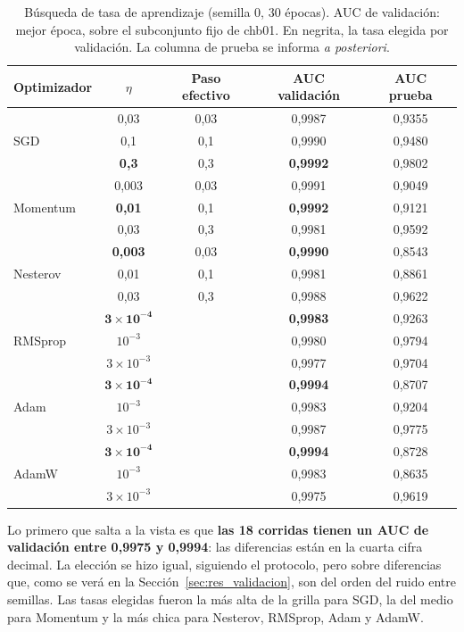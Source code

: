 \begin{table}[ht]
\centering
\caption{Búsqueda de tasa de aprendizaje (semilla 0, 30 épocas). AUC de validación: mejor época, sobre el subconjunto
fijo de chb01. En negrita, la tasa elegida por validación. La columna de prueba se informa \emph{a posteriori}.}
\label{tab:busqueda}
\begin{tabular}{lcccc}
\toprule
Optimizador & $\eta$ & Paso efectivo & AUC validación & AUC prueba \\
\midrule
\multirow{3}{*}{SGD}
 & 0,03 & 0,03 & 0,9987 & 0,9355 \\
 & 0,1  & 0,1  & 0,9990 & 0,9480 \\
 & \textbf{0,3} & 0,3 & \textbf{0,9992} & 0,9802 \\
\midrule
\multirow{3}{*}{Momentum}
 & 0,003 & 0,03 & 0,9991 & 0,9049 \\
 & \textbf{0,01} & 0,1 & \textbf{0,9992} & 0,9121 \\
 & 0,03  & 0,3  & 0,9981 & 0,9592 \\
\midrule
\multirow{3}{*}{Nesterov}
 & \textbf{0,003} & 0,03 & \textbf{0,9990} & 0,8543 \\
 & 0,01  & 0,1  & 0,9981 & 0,8861 \\
 & 0,03  & 0,3  & 0,9988 & 0,9622 \\
\midrule
\multirow{3}{*}{RMSprop}
 & $\mathbf{3\times10^{-4}}$ & & \textbf{0,9983} & 0,9263 \\
 & $10^{-3}$        & & 0,9980 & 0,9794 \\
 & $3\times10^{-3}$ & & 0,9977 & 0,9704 \\
\midrule
\multirow{3}{*}{Adam}
 & $\mathbf{3\times10^{-4}}$ & & \textbf{0,9994} & 0,8707 \\
 & $10^{-3}$        & & 0,9983 & 0,9204 \\
 & $3\times10^{-3}$ & & 0,9987 & 0,9775 \\
\midrule
\multirow{3}{*}{AdamW}
 & $\mathbf{3\times10^{-4}}$ & & \textbf{0,9994} & 0,8728 \\
 & $10^{-3}$        & & 0,9983 & 0,8635 \\
 & $3\times10^{-3}$ & & 0,9975 & 0,9619 \\
\bottomrule
\end{tabular}
\end{table}

Lo primero que salta a la vista es que \textbf{las 18 corridas tienen un AUC de validación entre 0,9975 y 0,9994}: las
diferencias están en la cuarta cifra decimal. La elección se hizo igual, siguiendo el protocolo, pero sobre diferencias que,
como se verá en la Sección~\ref{sec:res_validacion}, son del orden del ruido entre semillas. Las tasas elegidas fueron
la más alta de la grilla para SGD, la del medio para Momentum y la más chica para Nesterov, RMSprop, Adam y AdamW.

